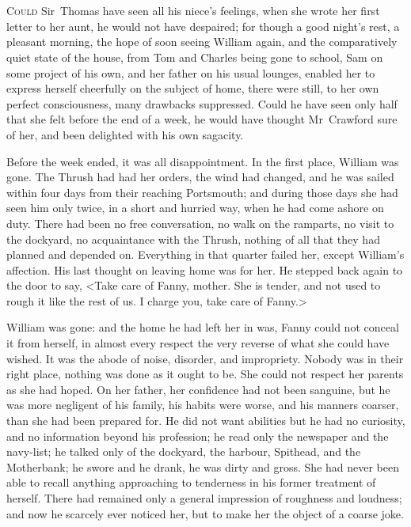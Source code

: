 \chapter[Chapter \thechapter]{} 

 \lettrine[lraise=0.3]{C}{ould} Sir~Thomas have seen all his niece's feelings, when she wrote her first letter to her aunt, he would not have despaired; for though a good night's rest, a pleasant morning, the hope of soon seeing William again, and the comparatively quiet state of the house, from Tom and Charles being gone to school, Sam on some project of his own, and her father on his usual lounges, enabled her to express herself cheerfully on the subject of home, there were still, to her own perfect consciousness, many drawbacks suppressed. Could he have seen only half that she felt before the end of a week, he would have thought Mr~Crawford sure of her, and been delighted with his own sagacity.

Before the week ended, it was all disappointment. In the first place, William was gone. The Thrush had had her orders, the wind had changed, and he was sailed within four days from their reaching Portsmouth; and during those days she had seen him only twice, in a short and hurried way, when he had come ashore on duty. There had been no free conversation, no walk on the ramparts, no visit to the dockyard, no acquaintance with the Thrush, nothing of all that they had planned and depended on. Everything in that quarter failed her, except William's affection. His last thought on leaving home was for her. He stepped back again to the door to say, <Take care of Fanny, mother. She is tender, and not used to rough it like the rest of us. I charge you, take care of Fanny.>

William was gone: and the home he had left her in was, Fanny could not conceal it from herself, in almost every respect the very reverse of what she could have wished. It was the abode of noise, disorder, and impropriety. Nobody was in their right place, nothing was done as it ought to be. She could not respect her parents as she had hoped. On her father, her confidence had not been sanguine, but he was more negligent of his family, his habits were worse, and his manners coarser, than she had been prepared for. He did not want abilities but he had no curiosity, and no information beyond his profession; he read only the newspaper and the navy-list; he talked only of the dockyard, the harbour, Spithead, and the Motherbank; he swore and he drank, he was dirty and gross. She had never been able to recall anything approaching to tenderness in his former treatment of herself. There had remained only a general impression of roughness and loudness; and now he scarcely ever noticed her, but to make her the object of a coarse joke.

